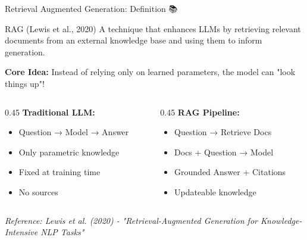 \documentclass[aspectratio=169]{beamer}
\begin{document}
\begin{frame}[shrink=10]{Retrieval Augmented Generation: Definition 📚}
\begin{block}{RAG (Lewis et al., 2020)}
A technique that enhances LLMs by retrieving relevant documents from an external knowledge base and using them to inform generation.
\end{block}

\vspace{1em}

\textbf{Core Idea:} Instead of relying only on learned parameters, the model can "look things up"!

\vspace{1em}

\begin{columns}[T]
\begin{column}{0.45\textwidth}
\textbf{Traditional LLM:}
\begin{itemize}\setlength{\itemsep}{0pt}
    \item Question → Model → Answer
    \item Only parametric knowledge
    \item Fixed at training time
    \item No sources
\end{itemize}
\end{column}

\begin{column}{0.45\textwidth}
\textbf{RAG Pipeline:}
\begin{itemize}\setlength{\itemsep}{0pt}
    \item Question → Retrieve Docs
    \item Docs + Question → Model
    \item Grounded Answer + Citations
    \item Updateable knowledge
\end{itemize}
\end{column}
\end{columns}

\vspace{1em}
\small
\textit{Reference: Lewis et al. (2020) - "Retrieval-Augmented Generation for Knowledge-Intensive NLP Tasks"}
\end{frame}
\end{document}
